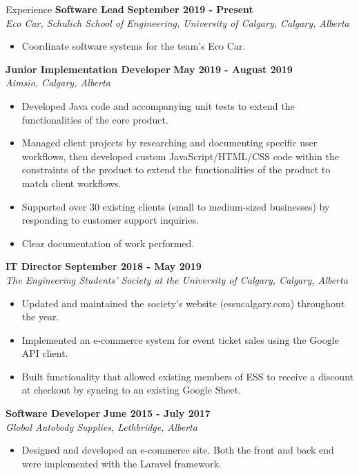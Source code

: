 \documentclass{resume} %
\begin{document}
\begin{Entry}{Experience}
{\bf Software Lead} \hfill {\bf September 2019 - Present}
\\{\em Eco Car, Schulich School of Engineering, University of Calgary, Calgary, Alberta}
\begin{itemize} \itemsep -5pt
  \item Coordinate software systems for the team’s Eco Car.
\end{itemize}

{\bf Junior Implementation Developer} \hfill {\bf May 2019 - August 2019}
\\{\em Aimsio, Calgary, Alberta}
\begin{itemize} \itemsep -5pt
  \item Developed Java code and accompanying unit tests to extend the functionalities of the core product. 
  \item Managed client projects by researching and documenting specific user workflows, then developed custom JavaScript/HTML/CSS code within the constraints of the product to extend the functionalities of the product to match client workflows. 
  \item Supported over 30  existing clients (small to medium-sized businesses) by responding to customer support inquiries.
  \item Clear documentation of work performed.
\end{itemize}

{\bf IT Director} \hfill {\bf September 2018 - May 2019}
\\{\em The Engineering Students' Society at the University of Calgary, Calgary, Alberta}
\begin{itemize} \itemsep -5pt
    \item Updated and maintained the society's website (essucalgary.com) throughout the year. 
    \item Implemented an e-commerce system for event ticket sales using the Google API client.
    \item Built functionality that allowed existing members of ESS to receive a discount at checkout by syncing to an existing Google Sheet.
\end{itemize}

{\bf Software Developer} \hfill {\bf June 2015 - July 2017}
\\{\em Global Autobody Supplies, Lethbridge, Alberta}
\begin{itemize} \itemsep -5pt
    \item Designed and developed an e-commerce site. Both the front and back end were implemented with the Laravel framework. 
\end{itemize}


\end{Entry}
\end{document}
